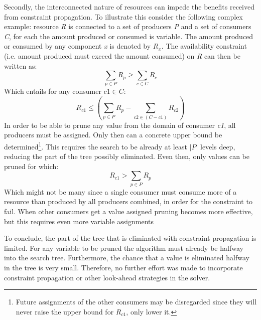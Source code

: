 Secondly, the interconnected nature of resources can impede the benefits received from constraint propagation. To illustrate this consider the following complex example: resource \emph{R} is connected to a set of producers \emph{P} and a set of consumers \emph{C}, for each the amount produced or consumed is variable. The amount produced or consumed by any component \emph{x} is denoted by $R_x$. The availability constraint (i.e. amount produced must exceed the amount consumed) on \emph{R} can then be written as:
$$\sum_{p \in P}R_p \geq \sum_{c \in C}R_c$$
Which entails for any consumer $c1 \in C$: 
$$R_{c1} \leq \left(\sum_{p \in P} R_p - \sum_{c2 \in (C-c1)} R_{c2}\right)$$
In order to be able to prune any value from the domain of consumer \emph{c1}, all producers must be assigned. Only then can a concrete upper bound be determined\setcounter{footnote}{1}\footnote{Future assignments of the other consumers may be disregarded since they will never raise the upper bound for $R_{c1}$, only lower it.}. This requires the search to be already at least $|P|$ levels deep, reducing the part of the tree possibly eliminated. Even then, only values can be pruned for which:
$$R_{c1} > \sum_{p \in P} R_p$$
Which might not be many since a single consumer must consume more of a resource than produced by all producers combined, in order for the constraint to fail. When other consumers get a value assigned pruning becomes more effective, but this requires even more variable assignments

To conclude, the part of the tree that is eliminated with constraint propagation is limited. For any variable to be pruned the algorithm must already be halfway into the search tree. Furthermore, the chance that a value is eliminated halfway in the tree is very small. Therefore, no further effort was made to incorporate constraint propagation or other look-ahead strategies in the solver.



	









